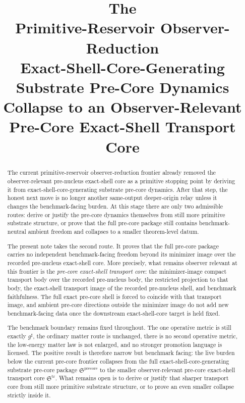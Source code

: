 \documentclass[11pt]{article}
\title{\textbf{The \TheoryName{}}\\[0.4em]
\large Primitive-Reservoir Observer-Reduction\\
\large Exact-Shell-Core-Generating Substrate Pre-Core Dynamics\\
\large Collapse to an Observer-Relevant Pre-Core Exact-Shell Transport Core}
\author{}
\date{}
\newcommand{\CompletedMetric}{g^{\sharp}}
\newcommand{\PreCorePackage}{\mathfrak S^{\mathrm{precore}}}
\newcommand{\PreCoreTransportCore}{\mathfrak S^{\mathrm{tr}}}
\begin{document}
\maketitle

\begin{abstract}
The current primitive-reservoir observer-reduction frontier already removed the observer-relevant pre-nucleus exact-shell core as a primitive stopping point by deriving it from exact-shell-core-generating substrate pre-core dynamics. After that step, the honest next move is no longer another same-output deeper-origin relay unless it changes the benchmark-facing burden. At this stage there are only two admissible routes: derive or justify the pre-core dynamics themselves from still more primitive substrate structure, or prove that the full pre-core package still contains benchmark-neutral ambient freedom and collapses to a smaller theorem-level datum.

The present note takes the second route. It proves that the full pre-core package carries no independent benchmark-facing freedom beyond its minimizer image over the recorded pre-nucleus exact-shell core. More precisely, what remains observer relevant at this frontier is the \emph{pre-core exact-shell transport core}: the minimizer-image compact transport body over the recorded pre-nucleus body, the restricted projection to that body, the exact-shell transport image of the recorded pre-nucleus shell, and benchmark faithfulness. The full exact pre-core shell is forced to coincide with that transport image, and ambient pre-core directions outside the minimizer image do not add new benchmark-facing data once the downstream exact-shell-core target is held fixed.

The benchmark boundary remains fixed throughout. The one operative metric is still exactly \(\CompletedMetric\), the ordinary matter route is unchanged, there is no second operative metric, the low-energy matter law is not enlarged, and no stronger promotion language is licensed. The positive result is therefore narrow but benchmark facing: the live burden below the current pre-core frontier collapses from the full exact-shell-core-generating substrate pre-core package \(\PreCorePackage\) to the smaller observer-relevant pre-core exact-shell transport core \(\PreCoreTransportCore\). What remains open is to derive or justify that sharper transport core from still more primitive substrate structure, or to prove an even smaller collapse strictly inside it.
\end{abstract}
\end{document}

